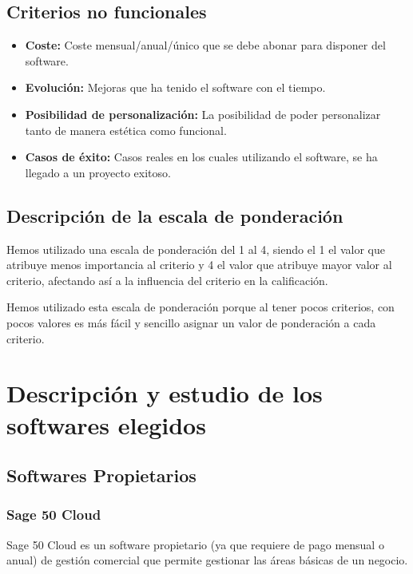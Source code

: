 \documentclass{article}
\begin{document}
\subsection{Criterios no funcionales}

\begin{itemize}
	\item \textbf{Coste:} Coste mensual/anual/único que se debe abonar para disponer del software.
	\item \textbf{Evolución:} Mejoras que ha tenido el software con el tiempo. 
	\item \textbf{Posibilidad de personalización:} La posibilidad de poder personalizar tanto de manera estética como funcional. 
	\item \textbf{Casos de éxito:} Casos reales en los cuales utilizando el software, se ha llegado a un proyecto exitoso.  
\end{itemize}

\subsection{Descripción de la escala de ponderación}

Hemos utilizado una escala de ponderación del 1 al 4, siendo el 1 el valor que atribuye menos importancia al criterio y 4 el valor que atribuye mayor valor al criterio, afectando así a la influencia del criterio en la calificación. 

Hemos utilizado esta escala de ponderación porque al tener pocos criterios, con pocos valores es más fácil y sencillo asignar un valor de ponderación a cada criterio. 

\section{Descripción y estudio de los softwares elegidos}

\subsection{Softwares Propietarios}

\subsubsection{Sage 50 Cloud}
	
	Sage 50 Cloud es un software propietario (ya que requiere de pago mensual o anual) de gestión comercial que permite gestionar las áreas básicas de un negocio. 
	
\end{document}
